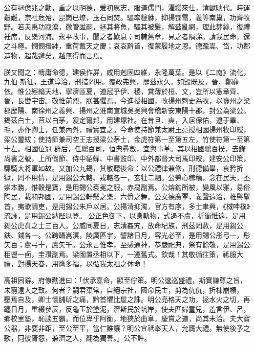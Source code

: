 \begin{pinyinscope}
 公有拯億兆之勳，重之以明德，爰初厲志，服道儒門，濯纓來仕，清猷映代。時運艱難，宗社危殆，昆崗已燎，玉石同焚。驅率貔貅，抑揚霆電，義等南巢，功齊牧野。若夫禹功寂漠，微管誰嗣，拯其將魚，驅其被髮，解茲亂網，理此棼絲，復禮衽席，反樂河海。永平故事，聞之者歎息；司隸舊章，見之者隕涕。請我民命，還之斗極。憫憫搢紳，重荷戴天之慶；哀哀黔首，復蒙履地之恩。德踰嵩、岱，功鄰造物，超哉邈矣，越無得而言焉。



 朕又聞之：疇庸命德，建侯作屏，咸用剋固四維，永隆萬葉。是以《二南》流化，九伯
 斯征，王道淳洽，刑措罔用。覆政弗興，歷茲永久，如毀既及，晉、鄭靡依。惟公經綸天地，寧濟區夏，道冠乎伊、稷，賞薄於桓、文，豈所以憲章齊、魯，長轡宇宙。敬惟前烈，朕甚懼焉。今進授相國，改揚州刺史為牧，以豫州之梁郡歷陽、南徐州之義興、揚州之淮南宣城吳吳興會稽新安東陽十郡，封公為梁公。錫茲白土，苴以白茅，爰定爾邦，用建塚社。在昔旦、奭，入居保佑，逮于畢、毛，亦作卿士，任兼內外，禮實宜之。今命使持節兼太尉王亮授相國揚州牧印綬，梁公璽紱；使持節兼司空王志授梁公茅土，金虎符第一至第五左，竹使符第一至第十左。相國位冠
 群后，任總百司，恒典彞數，宜與事革。其以相國總百揆，去錄尚書之號，上所假節、侍中貂蟬、中書監印、中外都督大司馬印綬，建安公印策，驃騎大將軍如故。又加公九錫，其敬聽後命：以公禮律兼修，刑德備舉，哀矜折獄，罔不用情，是用錫公大輅、戎輅各一，玄牡二駟。公勞心稼穡，念在民天，丕崇本務，惟穀是寶，是用錫公袞冕之服，赤舄副焉。公熔鈞所被，變風以雅，易俗陶民，載和邦國，是用錫公軒懸之樂，六佾之舞。公文德廣覃，義聲遠洽，椎髻髽首，夷歌請吏，是用錫公朱戶以居。公揚清抑濁，官方有序，多士聿興，《棫呻樸》流詠，是用錫公納陛以登。
 公正色御下，以身軌物，式遏不虞，折衝惟遠，是用錫公虎賁之士三百人。公威同夏日，志清姦宄，放命圮族，刑茲罔赦，是用錫公鈇、鉞各一。公跨躡嵩溟，陵厲區宇，譬諸日月，容光必至，是用錫公彤弓一，彤矢百；盧弓十，盧矢千。公永言惟孝，至感通神，恭嚴祀典，祭有餘敬，是用錫公秬鬯一卣，圭瓚副焉。梁國置丞相以下，一遵舊式。欽哉！其敬循往策，祗服大禮，對揚天眷，用膺多福，以弘我太祖之休命！



 高祖固辭。府僚勸進曰：「伏承嘉命，顯至佇策。明公逡巡盛禮，斯實謙尊之旨，未窮遠大之致。何者？嗣君棄常，自絕宗社，國命民主，剪為仇仇，折棟崩榱，
 壓焉自及，卿士懷脯斫之痛，黔首懼比屋之誅。明公亮格天之功，拯水火之切，再躔日月，重綴參辰，反龜玉於塗泥，濟斯民於坑岸，使夫匹婦童兒，羞言伊、呂，鄉校里塾，恥談五霸。而位卑乎阿衡，地狹於曲阜，慶賞之道，尚其未洽。夫大寶公器，非要非距，至公至平，當仁誰讓？明公宜祗奉天人，允膺大禮。無使後予之歌，同彼胥怨，兼濟之人，翻為獨善。」公不許。




\end{pinyinscope}
